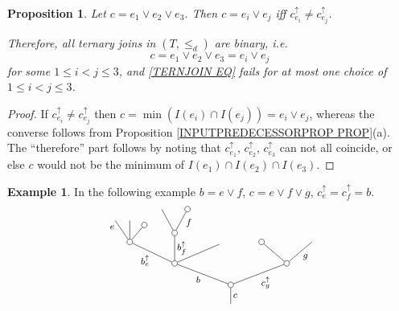 \documentclass[a4paper,10pt
,draft
]{article}%
\numberwithin{equation}{section}
\numberwithin{figure}{section}
\newtheorem{proposition}[equation]{Proposition}%
\theoremstyle{definition} %
\newtheorem{example}[equation]{Example}%
\newcommand{\1}{\ensuremath{\mathbbm 1}}%
\begin{document}
\begin{proposition}
\label{TERNARYJOIN PROP}
Let $c = e_1 \vee e_2 \vee e_3$.
Then $c = e_i \vee e_j$ iff $c^{\uparrow}_{e_i} \neq c^{\uparrow}_{e_j}$.

Therefore, all ternary joins in $(T,\leq_d)$ are binary, i.e.
\begin{equation}\label{TERNJOIN EQ}
	c = e_1 \vee e_2 \vee e_3 = e_i \vee e_j
\end{equation}
for some $1\leq i <j \leq 3$, and
\eqref{TERNJOIN EQ} fails for 
 at most one choice of $1\leq i <j \leq 3$.
\end{proposition}


\begin{proof}
If $c^{\uparrow}_{e_i} \neq c^{\uparrow}_{e_j}$ then
$c = \min\left(I(e_i) \cap I(e_j)\right) = e_i \vee e_j$, whereas the converse follows from Proposition \ref{INPUTPREDECESSORPROP PROP}(a).
%
The ``therefore'' part follows by noting that 
$c^{\uparrow}_{e_1}$, $c^{\uparrow}_{e_2}$, $c^{\uparrow}_{e_3}$
can not all coincide, or else $c$ would not be the minimum of
$I(e_1) \cap I(e_2) \cap I(e_3)$. 
\end{proof}


\begin{example} In the following example $b = e \vee f$, $c = e \vee f \vee g$, $c^{\uparrow}_e= c^{\uparrow}_f =b$.
\[
	\begin{tikzpicture}[grow=up,auto,level distance=1.9em,
	every node/.style = {font=\footnotesize,inner sep=2pt},
	dummy/.style={circle,draw,inner sep=0pt,minimum size=1.75mm}]
		\node at (0,0) {}
			child{node [dummy] {}
				child[sibling distance = 10em]{node [dummy] {}
					child[sibling distance = 4.5em]{
					edge from parent node [swap] {$g$}}
					child[sibling distance = 4.5em]{node [dummy] {}}
				edge from parent node [swap] {$c_g^{\uparrow}$}}
				child[sibling distance = 10em]{node [dummy] {}
					child[sibling distance = 4em,level distance=1.7em]
					child[sibling distance = 1.5em,level distance=2.7em]{node [dummy] {}
						child[level distance=2.1em,sibling distance = 2.3em]{node [dummy] {}
						edge from parent node [near end,swap] {$f$}}		
						child[level distance=2.1em,sibling distance = 2.3em]{
						edge from parent node [near end] {}}
					edge from parent node [swap] {$b^{\uparrow}_{f}$}}
					child[sibling distance = 4em]{node [dummy] {}
						child[sibling distance =1.3em, level distance = 1.5 em]{node [dummy]  {}
						edge from parent node [swap] {}}
						child[sibling distance = 1.3em]{
						edge from parent node [very near end,swap] {}}
						child[sibling distance =1.3em]{
						edge from parent node [very near end] {$e$}}
					edge from parent node {$b^{\uparrow}_e$}}
				edge from parent node {$b$}}
			edge from parent node [swap] {$c$}};
	\end{tikzpicture}
\]
\end{example}
\end{document}

